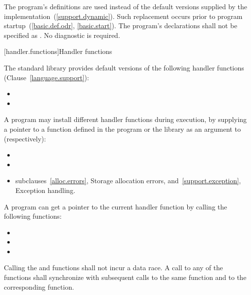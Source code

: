 \pnum
The program's definitions are used instead of the default versions supplied by
the implementation~(\ref{support.dynamic}).
Such replacement occurs prior to program startup~(\ref{basic.def.odr}, \ref{basic.start}).
%
The program's declarations shall not be specified as
.
No diagnostic is required.

[handler.functions]{Handler functions}

\pnum
The \Cpp standard library provides default versions of the following handler
functions (Clause~\ref{language.support}):

\begin{itemize}
\item
{}
%
\item
{}
%
\end{itemize}

\pnum
A \Cpp program may install different handler functions during execution, by
supplying a pointer to a function defined in the program or the library
as an argument to (respectively):

\begin{itemize}
\item
{}%
\item
{}%
\item
{}

\xref
subclauses~\ref{alloc.errors}, Storage allocation errors, and~\ref{support.exception}, 
Exception handling.
\end{itemize}

\pnum
A \Cpp program can get a pointer to the current handler function by calling the following 
functions:

\begin{itemize}
\item
{}%
\item
{}%
\item
{}
\end{itemize}

\pnum
Calling the  and  functions shall not incur a data race. A call to
any of the  functions shall synchronize with subsequent calls to the same
 function and to the corresponding  function.

